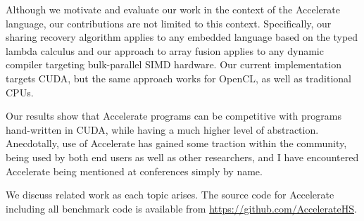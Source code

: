 Although we motivate and evaluate our work in the context of the Accelerate
language, our contributions are not limited to this context. Specifically, our
sharing recovery algorithm applies to any embedded language based on the typed
lambda calculus and our approach to array fusion applies to any dynamic compiler
targeting bulk-parallel SIMD hardware. Our current implementation targets CUDA,
but the same approach works for OpenCL, as well as traditional CPUs.

Our results show that Accelerate programs can be competitive with programs
hand-written in CUDA, while having a much higher level of abstraction.
Anecdotally, use of Accelerate has gained some traction within the community,
being used by both end users as well as other researchers, and I have
encountered Accelerate being mentioned at conferences simply by name.

We discuss related work as each topic arises. The source code for Accelerate
including all benchmark code is available from
\url{https://github.com/AccelerateHS}.


%

